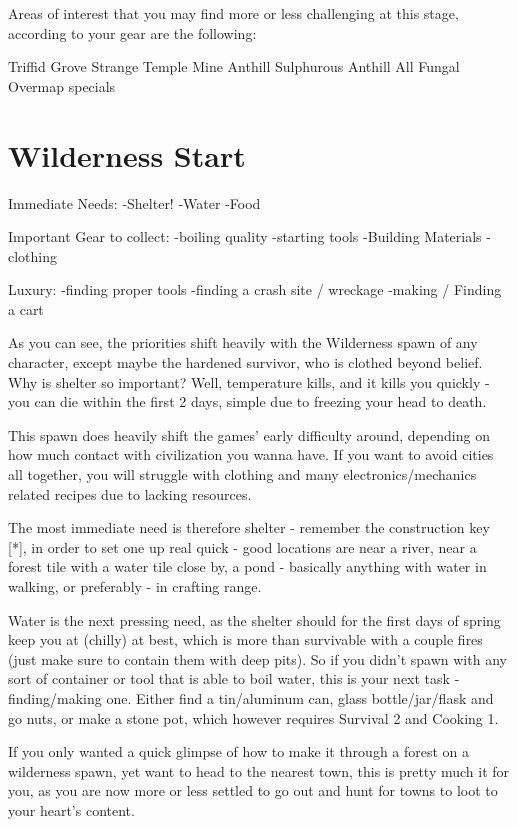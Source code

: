 Areas of interest that you may find more or less challenging at this stage, according to your gear are the following:

Triffid Grove
Strange Temple
Mine
Anthill
Sulphurous Anthill
All Fungal Overmap specials

\section{Wilderness Start}

Immediate Needs:
	-Shelter!
	-Water
	-Food

Important Gear to collect:
	-boiling quality
	-starting tools
	-Building Materials
	-clothing

Luxury:
	-finding proper tools
	-finding a crash site / wreckage
	-making / Finding a cart

As you can see, the priorities shift heavily with the Wilderness spawn of any character, except maybe the hardened survivor, who is clothed beyond belief. Why is shelter so important? Well, temperature kills, and it kills you quickly - you can die within the first 2 days, simple due to freezing your head to death.

This spawn does heavily shift the games' early difficulty around, depending on how much contact with civilization you wanna have. If you want to avoid cities all together, you will struggle with clothing and many electronics/mechanics related recipes due to lacking resources.

The most immediate need is therefore shelter - remember the construction key [*], in order to set one up real quick - good locations are near a river, near a forest tile with a water tile close by, a pond - basically anything with water in walking, or preferably - in crafting range.

Water is the next pressing need, as the shelter should for the first days of spring keep you at (chilly) at best, which is more than survivable with a couple fires (just make sure to contain them with deep pits). So if you didn't spawn with any sort of container or tool that is able to boil water, this is your next task - finding/making one. Either find a tin/aluminum can, glass bottle/jar/flask and go nuts, or make a stone pot, which however requires Survival 2 and Cooking 1.

If you only wanted a quick glimpse of how to make it through a forest on a wilderness spawn, yet want to head to the nearest town, this is pretty much it for you, as you are now more or less settled to go out and hunt for towns to loot to your heart's content.


